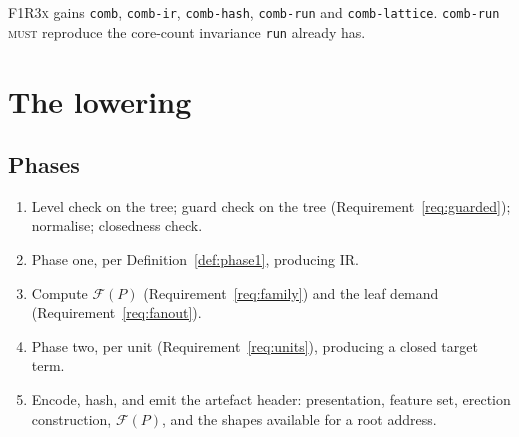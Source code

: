 \documentclass[11pt,a4paper]{article}
\newcommand{\code}[1]{\texttt{#1}}
\newcommand{\Fx}{\textsc{F1R3x}}
\newcommand{\MUST}{\textsc{must}}
\theoremstyle{definition}
\theoremstyle{plain}
\begin{document}
\begin{center}
\end{center}

\Fx{} gains \code{comb}, \code{comb-ir}, \code{comb-hash}, \code{comb-run} and
\code{comb-lattice}. \code{comb-run} \MUST{} reproduce the core-count
invariance \code{run} already has.

\section{The lowering}\label{sec:lower}

\subsection{Phases}

\begin{enumerate}[leftmargin=1.6em]
\item Level check on the tree; guard check on the tree
(Requirement~\ref{req:guarded}); normalise; closedness check.
\item Phase one, per Definition~\ref{def:phase1}, producing IR.
\item Compute $\mathcal{F}(P)$ (Requirement~\ref{req:family}) and the leaf
demand (Requirement~\ref{req:fanout}).
\item Phase two, per unit (Requirement~\ref{req:units}), producing a closed
target term.
\item Encode, hash, and emit the artefact header: presentation, feature set,
erection construction, $\mathcal{F}(P)$, and the shapes available for a root
address.
\end{enumerate}
\end{document}
